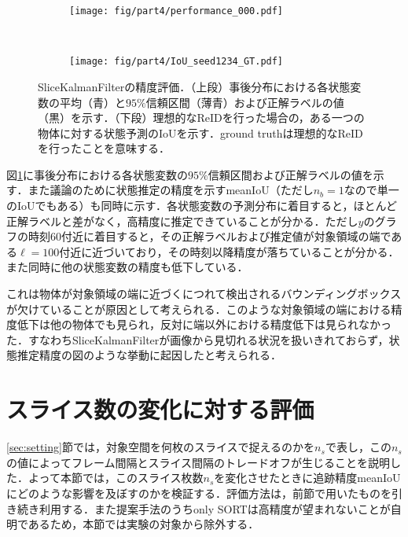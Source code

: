         \begin{figure}[t]
            \begin{subfigure}[t]{\linewidth}
                \centering
                \texttt{[image: fig/part4/performance\_000.pdf]}
            \end{subfigure}
            \\
            \begin{subfigure}[t]{\linewidth}
                \centering
                \texttt{[image: fig/part4/IoU\_seed1234\_GT.pdf]}
            \end{subfigure}
            \caption[SliceKalmanFilterの精度評価]{SliceKalmanFilterの精度評価．（上段）事後分布における各状態変数の平均（青）と$95\%$信頼区間（薄青）および正解ラベルの値（黒）を示す．（下段）理想的なReIDを行った場合の，ある一つの物体に対する状態予測のIoUを示す．ground truthは理想的なReIDを行ったことを意味する．}
            \label{fig:SKF_evaluation}
        \end{figure}

        図\ref{fig:SKF_evaluation}に事後分布における各状態変数の$95\%$信頼区間および正解ラベルの値を示す．また議論のために状態推定の精度を示すmeanIoU（ただし$n_b = 1$なので単一のIoUでもある）も同時に示す．各状態変数の予測分布に着目すると，ほとんど正解ラベルと差がなく，高精度に推定できていることが分かる．ただし$y$のグラフの時刻$60$付近に着目すると，その正解ラベルおよび推定値が対象領域の端である$\ell = 100$付近に近づいており，その時刻以降精度が落ちていることが分かる．また同時に他の状態変数の精度も低下している．

        これは物体が対象領域の端に近づくにつれて検出されるバウンディングボックスが欠けていることが原因として考えられる．このような対象領域の端における精度低下は他の物体でも見られ，反対に端以外における精度低下は見られなかった．すなわちSliceKalmanFilterが画像から見切れる状況を扱いきれておらず，状態推定精度の図のような挙動に起因したと考えられる．

\section{スライス数の変化に対する評価}
\label{sec:number_of_slice_effect}

\ref{sec:setting}節では，対象空間を何枚のスライスで捉えるのかを$n_s$で表し，この$n_s$の値によってフレーム間隔とスライス間隔のトレードオフが生じることを説明した．よって本節では，このスライス枚数$n_s$を変化させたときに追跡精度meanIoUにどのような影響を及ぼすのかを検証する．評価方法は，前節で用いたものを引き続き利用する．また提案手法のうちonly SORTは高精度が望まれないことが自明であるため，本節では実験の対象から除外する．


